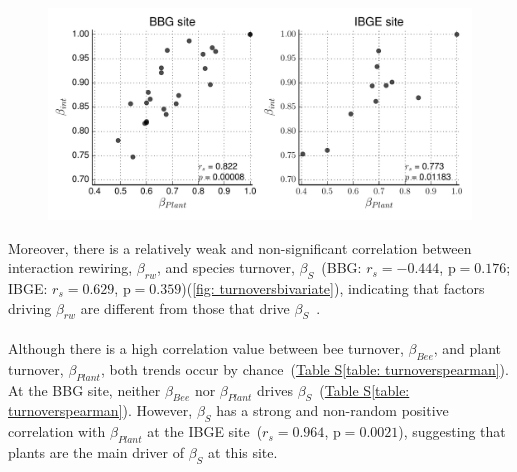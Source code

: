\documentclass[11pt]{article}
\begin{document}
\vspace*{\fill}
\begin{figure}[H]
  \centering
    \includegraphics[width=\textwidth]{plantturnover.pdf}
       \label{fig: plantturnover}
\end{figure} 
\vspace*{\fill}
Moreover, there is a relatively weak and non-significant correlation between interaction rewiring, $\beta_{rw}$, and species turnover, $\beta_{S}$~(BBG: $r_{s}=-0.444$, $\text{p}=0.176$; IBGE: $r_{s}=0.629$, $\text{p}=0.359$)(\autoref{fig: turnoversbivariate}), indicating that factors driving $\beta_{rw}$ are different from those that drive $\beta_{S}$~\citep{Poisot2012}. \\
\\
Although there is a high correlation value between bee turnover, $\beta_{Bee}$, and plant turnover, $\beta_{Plant}$, both trends occur by chance~(\hyperref[table: turnoverspearman]{Table S\ref{table: turnoverspearman}}). At the BBG site, neither $\beta_{Bee}$ nor $\beta_{Plant}$ drives $\beta_{S}$~(\hyperref[table: turnoverspearman]{Table S\ref{table: turnoverspearman}}). However, $\beta_{S}$ has a strong and non-random positive correlation with $\beta_{Plant}$ at the IBGE site~($r_{s}=0.964$, $\text{p}=0.0021$), suggesting that plants are the main driver of $\beta_{S}$ at this site. 
\vspace*{\fill}
\end{document}
